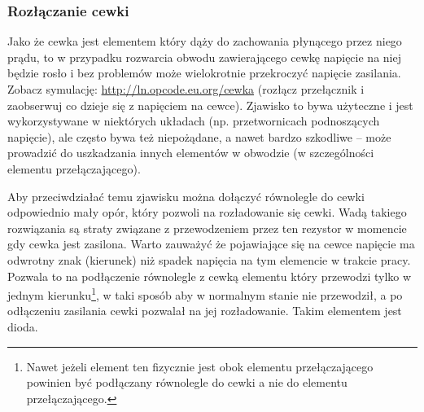 \subsubsection{Rozłączanie cewki}

Jako że cewka jest elementem który dąży do zachowania płynącego przez niego prądu, to w przypadku rozwarcia obwodu zawierającego cewkę napięcie na niej będzie rosło i bez problemów może wielokrotnie przekroczyć napięcie zasilania.
Zobacz symulację: \url{http://ln.opcode.eu.org/cewka} (rozłącz przełącznik i zaobserwuj co dzieje się z napięciem na cewce).
Zjawisko to bywa użyteczne i jest wykorzystywane w niektórych układach (np. przetwornicach podnoszących napięcie), ale często bywa też niepożądane, a nawet bardzo szkodliwe – może prowadzić do uszkadzania innych elementów w obwodzie (w szczególności elementu przełączającego).

Aby przeciwdziałać temu zjawisku można dołączyć równolegle do cewki odpowiednio mały opór, który pozwoli na rozładowanie się cewki.
Wadą takiego rozwiązania są straty związane z przewodzeniem przez ten rezystor w momencie gdy cewka jest zasilona.
Warto zauważyć że pojawiające się na cewce napięcie ma odwrotny znak (kierunek) niż spadek napięcia na tym elemencie w trakcie pracy.
Pozwala to na podłączenie równolegle z cewką elementu który przewodzi tylko w jednym kierunku\footnote{
	Nawet jeżeli element ten fizycznie jest obok elementu przełączającego powinien być podłączany równolegle do cewki a nie do elementu przełączającego.
}, w taki sposób aby w normalnym stanie nie przewodził, a po odłączeniu zasilania cewki pozwalał na jej rozładowanie.
Takim elementem jest dioda.
